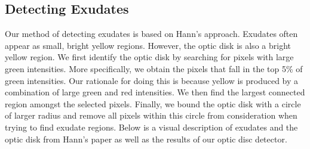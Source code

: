 \documentclass{article} %
\begin{document}
\begin{figure}[htp]
  \centering
  \quad
\end{figure}

\subsection{Detecting Exudates}
Our method of detecting exudates is based on Hann's approach. Exudates often appear as small, bright yellow regions. However, the optic disk is also a bright yellow region. We first identify the optic disk by searching for pixels with large green intensities. More specifically, we obtain the pixels that fall in the top 5\% of green intensities. Our rationale for doing this is because yellow is produced by a combination of large green and red intensities. We then find the largest connected region amongst the selected pixels. Finally, we bound the optic disk with a circle of larger radius and remove all pixels within this circle from consideration when trying to find exudate regions. Below is a visual description of exudates and the optic disk from Hann's paper as well as the results of our optic disc detector.

\begin{figure}[htp]
  \centering
  \quad
\end{figure}
\end{document}
